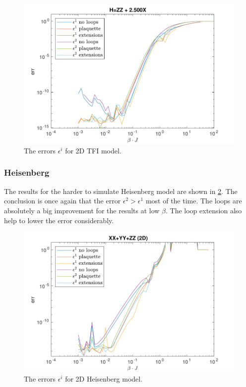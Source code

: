 \begin{figure}[!htbp]
    \center
    \includegraphics[width=\textwidth]{Figuren/benchmarking/2D_Err01_t_sing.pdf}
    \caption{The errors $\epsilon^i$ for 2D \Gls{TFI} model. }
    \label{fig:res2d:n1:tising}
\end{figure}

\subsubsection{Heisenberg}

The results for the harder to simulate Heisenberg model are shown in \cref{fig:res2d:n1:heis}. The conclusion is once again that the error $\epsilon^2 > \epsilon^1$ most of the time. The loops are absolutely a big improvement for  the results at low $\beta$. The loop extension also help to lower the error considerably.

\begin{figure}[!htbp]
    \center
    \includegraphics[width=\textwidth]{Figuren/benchmarking/2D_Err01_heis.pdf}
    \caption{The errors $\epsilon^i$ for 2D Heisenberg model. }
    \label{fig:res2d:n1:heis}
\end{figure}

